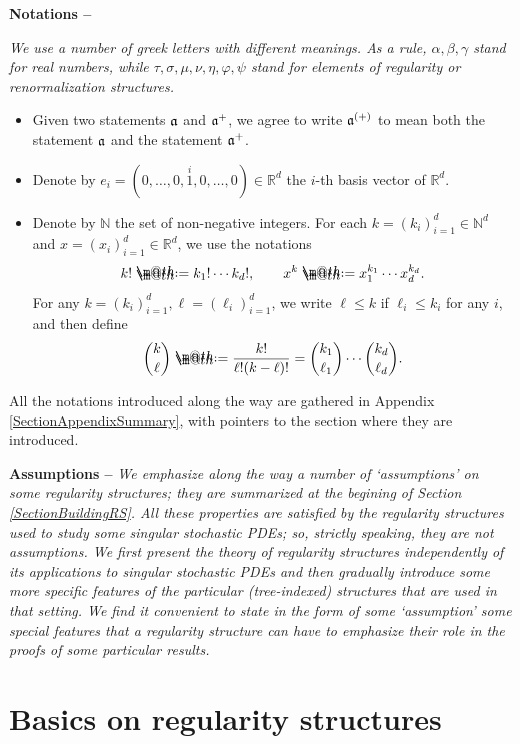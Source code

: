 \documentclass[10pt, reqno]{amsart}
\makeatletter
\numberwithin{subsection}{section}
\numberwithin{subsubsection}{subsection}
\numberwithin{equation}{section} %
\theoremstyle{mystyle}
\theoremstyle{mystyle2}
\theoremstyle{mystyle3}
\newcommand\bbN{\mathbb{N}}
\newcommand\bbR{\mathbb{R}}
\newcommand*{\defeq}{\mathrel{\rlap{%
                     \raisebox{0.3ex}{$\m@th\cdot$}}%
                     \raisebox{-0.3ex}{$\m@th\cdot$}}%
                     =}
\makeatother
\begin{document}
\medskip

\noindent \textbf{\textsf{Notations --}} {\it We use a number of greek letters with different meanings. As a rule, $\alpha, \beta,\gamma$ stand for real numbers, while $\tau, \sigma, \mu, \nu, \eta, \varphi,\psi$ stand for elements of regularity or renormalization structures. 
\begin{itemize}
   \item Given two statements $\frak{a}$ and $\frak{a}^+$, we agree to write $\frak{a}^{(+)}$ to mean both the statement $\frak{a}$ and the statement $\frak{a}^+$.
   \item Denote by $e_i=(0,\dots,0,\overset{i}{1},0,\dots,0)\in\bbR^d$ the $i$-th basis vector of $\bbR^d$.
   \item Denote by $\bbN$ the set of non-negative integers. For each $k=(k_i)_{i=1}^d\in\bbN^d$ and $x=(x_i)_{i=1}^d\in\bbR^d$, we use the notations
   $$
   k!\defeq k_1!\cdots k_d!,\qquad
   x^k\defeq x_1^{k_1}\cdots x_d^{k_d}.
   $$
   For any $k=(k_i)_{i=1}^d,\ell=(\ell_i)_{i=1}^d$, we write $\ell\le k$ if $\ell_i\le k_i$ for any $i$, and then define
   $$
   \binom{k}{\ell}\defeq\frac{k!}{\ell!(k-\ell)!}=\binom{k_1}{\ell_1}\cdots\binom{k_d}{\ell_d}.
   $$
\end{itemize}
All the notations introduced along the way are gathered in Appendix {\sf\ref{SectionAppendixSummary}}, with pointers to the section where they are introduced.}

\medskip

\noindent \textbf{\textsf{Assumptions --}} {\it We emphasize along the way a number of `assumptions' on some regularity structures; they are summarized at the begining of Section \ref{SectionBuildingRS}. All these properties are satisfied by the regularity structures used to study some singular stochastic PDEs; so, strictly speaking, they are not assumptions. We first present the theory of regularity structures independently of its applications to singular stochastic PDEs and then gradually introduce some more specific features of the particular (tree-indexed) structures that are used in that setting. We find it convenient to state in the form of some `assumption' some special features that a regularity structure can have to emphasize their role in the proofs of some particular results.}


\vfill \pagebreak


\section{Basics on regularity structures}
\label{SectionBasicsRS}
\end{document}

